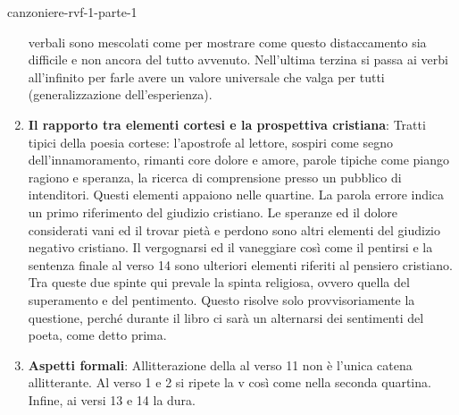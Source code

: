 \documentclass[preview]{standalone}
\begin{document}
\begin{snippet}{canzoniere-rvf-1-parte-1}
\begin{enumerate}
            verbali sono mescolati come per mostrare come questo distaccamento sia difficile e non ancora del
            tutto avvenuto. Nell'ultima terzina si passa ai verbi all'infinito per farle avere un valore universale
            che valga per tutti (generalizzazione dell'esperienza).
        \item \textbf{Il rapporto tra elementi cortesi e la prospettiva cristiana}:
            Tratti tipici della poesia cortese: l'apostrofe al lettore, sospiri come segno dell'innamoramento,
            rimanti core dolore e amore, parole tipiche come piango ragiono e speranza, la ricerca di
            comprensione presso un pubblico di intenditori. Questi elementi appaiono nelle quartine. La parola
            errore indica un primo riferimento del giudizio cristiano. Le speranze ed il dolore considerati vani ed
            il trovar pietà e perdono sono altri elementi del giudizio negativo cristiano. Il vergognarsi ed il
            vaneggiare così come il pentirsi e la sentenza finale al verso 14 sono ulteriori elementi riferiti al
            pensiero cristiano. Tra queste due spinte qui prevale la spinta religiosa, ovvero quella del
            superamento e del pentimento. Questo risolve solo provvisoriamente la questione, perché durante
            il libro ci sarà un alternarsi dei sentimenti del poeta, come detto prima.
        \item \textbf{Aspetti formali}:
            Allitterazione della  al verso 11 non è l'unica catena allitterante. Al verso 1 e 2 si ripete la v
            così come nella seconda quartina. Infine, ai versi 13 e 14 la  dura.
    \end{enumerate}
\end{snippet}
\end{document}
